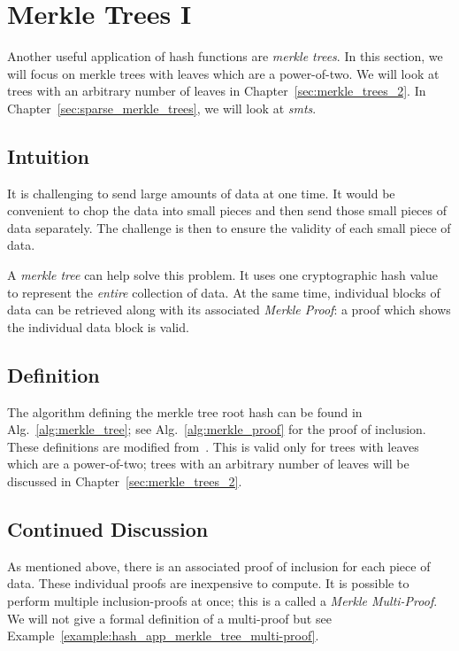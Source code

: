 \section{Merkle Trees I}
\label{sec:merkle_trees}

Another useful application of \glspl{hash function} are
\emph{\glspl{merkle tree}}.
In this section, we will focus on \glspl{merkle tree} with
leaves which are a power-of-two.
We will look at trees with an arbitrary number of leaves in
Chapter~\ref{sec:merkle_trees_2}.
In Chapter~\ref{sec:sparse_merkle_trees},
we will look at \emph{\glspl{smt}}.

\subsection{Intuition}

It is challenging to send large amounts of data at one time.
It would be convenient to chop the data into small pieces
and then send those small pieces of data separately.
The challenge is then to ensure the validity of each small
piece of data.

A \emph{\gls{merkle tree}} can help solve this problem.
It uses one cryptographic hash value to represent the \emph{entire}
collection of data.
At the same time, individual blocks of data can be retrieved
along with its associated \emph{Merkle Proof}:
a proof which shows the individual data block is valid.

\subsection{Definition}

The algorithm defining the \gls{merkle tree} root hash can be found in
Alg.~\ref{alg:merkle_tree};
see Alg.~\ref{alg:merkle_proof} for the proof of inclusion.
These definitions are modified
from~\cite[Chapter 8.9]{BonehShoupGraduateApplied}.
This is valid only for trees with leaves
which are a power-of-two;
trees with an arbitrary number of leaves will be discussed
in Chapter~\ref{sec:merkle_trees_2}.




\subsection{Continued Discussion}

As mentioned above, there is an associated proof of inclusion
for each piece of data.
These individual proofs are inexpensive to compute.
It is possible to perform multiple inclusion-proofs at once;
this is a called a \emph{Merkle Multi-Proof}.
We will not give a formal definition of a multi-proof
but see Example~\ref{example:hash_app_merkle_tree_multi-proof}.

